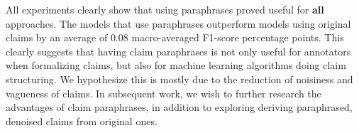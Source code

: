 
All experiments clearly show that using paraphrases proved useful for
\textbf{all} approaches.  The models that use paraphrases outperform models
using original claims by an average of $0.08$ macro-averaged F1-score
percentage points.  This clearly suggests that having claim paraphrases is not
only useful for annotators when formalizing claims, but also for machine
learning algorithms doing claim structuring.  We hypothesize this is mostly due
to the reduction of noisiness and vagueness of claims.  In subsequent work, we wish
to further research the advantages of claim paraphrases, in addition to 
exploring deriving paraphrased, denoised claims from original ones. 


